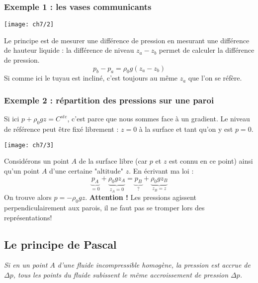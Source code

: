 	    \subsubsection{Exemple 1 : les vases communicants}
        \begin{center}
        \texttt{[image: ch7/2]}
        \end{center}
		Le principe est de mesurer une différence de pression  en mesurant une 
		différence de hauteur liquide : la différence de niveau $z_a-z_b$ permet 
		de calculer la différence de pression.
		\begin{equation}
		p_b-p_a = \rho_0g(z_a-z_b)
		\end{equation}
		Si comme ici le tuyau est incliné, c'est toujours au même $z_a$ que l'on 
		se réfère.
		
		\subsubsection{Exemple 2 : répartition des pressions sur une paroi}
		Si ici $p+\rho_0gz = C^{ste}$, c'est parce que nous sommes face à un 
		gradient. Le niveau de référence peut être fixé librement : $z=0$ à la 
		surface et tant qu'on y est $p=0$.\\
\begin{center}
\texttt{[image: ch7/3]}
\end{center}
 		
		Considérons un point $A$ de la surface libre (car $p$ et $z$ est connu en ce
		point) ainsi qu'un point $A$ d'une certaine "altitude" $z$. En écrivant ma loi :
		\begin{equation}
		\underbrace{p_A}_{=0} + \underbrace{\rho_0gz_A}_{z_A=0} = \underbrace{p_B}_{?} +
		\underbrace{\rho_0gz_B}_{z_B=z}
		\end{equation}				
		On trouve alors $p=-\rho_0gz$. \textbf{Attention !} Les pressions agissent 
		perpendiculairement aux parois, il ne faut pas se tromper lors des représentations!
				
		
    \subsection{Le principe de Pascal}
    \textit{Si en un point $A$ d'une fluide incompressible homogène, la pression est 
    accrue de $\Delta p$, tous les points du fluide subissent le même accroissement de 
    pression $\Delta p$.}   